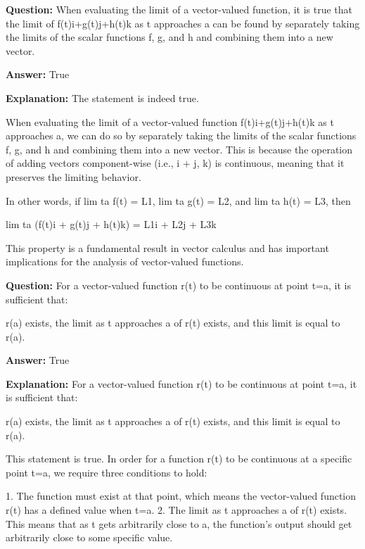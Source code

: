 \documentclass{article}
\begin{document}
                \vspace{0.5cm} 
        
            
                \textbf {Question:} When evaluating the limit of a vector-valued function, it is true that the limit of f(t)i+g(t)j+h(t)k as t approaches a can be found by separately taking the limits of the scalar functions f, g, and h and combining them into a new vector.
                
                \textbf{Answer:} True

                \textbf{Explanation:} The statement is indeed true.

When evaluating the limit of a vector-valued function f(t)i+g(t)j+h(t)k as t approaches a, we can do so by separately taking the limits of the scalar functions f, g, and h and combining them into a new vector. This is because the operation of adding vectors component-wise (i.e., i + j, k) is continuous, meaning that it preserves the limiting behavior.

In other words, if lim t{\textrightarrow}a f(t) = L1, lim t{\textrightarrow}a g(t) = L2, and lim t{\textrightarrow}a h(t) = L3, then

lim t{\textrightarrow}a (f(t)i + g(t)j + h(t)k) = L1i + L2j + L3k

This property is a fundamental result in vector calculus and has important implications for the analysis of vector-valued functions.
                
                \vspace{0.5cm} 
        
            
                \textbf {Question:} For a vector-valued function r(t) to be continuous at point t=a, it is sufficient that:

r(a) exists, the limit as t approaches a of r(t) exists, and this limit is equal to r(a).
                
                \textbf{Answer:} True

                \textbf{Explanation:} For a vector-valued function r(t) to be continuous at point t=a, it is sufficient that:

r(a) exists, the limit as t approaches a of r(t) exists, and this limit is equal to r(a).

This statement is true. In order for a function r(t) to be continuous at a specific point t=a, we require three conditions to hold: 

1. The function must exist at that point, which means the vector-valued function r(t) has a defined value when t=a.
2. The limit as t approaches a of r(t) exists. This means that as t gets arbitrarily close to a, the function's output should get arbitrarily close to some specific value.
\end{document}
